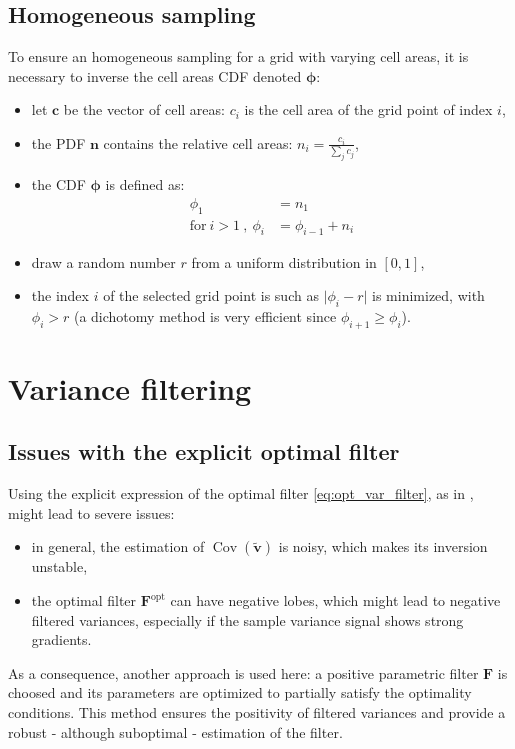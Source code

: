 \documentclass[12pt]{scrartcl}
\DeclareMathOperator{\Cov}{Cov}
\begin{document}
\subsection{Homogeneous sampling}
To ensure an homogeneous sampling for a grid with varying cell areas, it is necessary to inverse the cell areas CDF denoted $\boldsymbol{\phi}$:
\begin{itemize}
\item let $\mathbf{c}$ be the vector of cell areas: $c_i$ is the cell area of the grid point of index $i$,
\item the PDF $\mathbf{n}$ contains the relative cell areas: $\displaystyle n_i = \frac{c_i}{\sum_j c_j}$,
\item the CDF $\boldsymbol{\phi}$ is defined as:
\begin{subequations}
\begin{align}
\phi_1 & = n_1 \\
\text{for} \ i > 1 \ , \ \phi_i & = \phi_{i-1} + n_i
\end{align}
\end{subequations}
\item draw a random number $r$ from a uniform distribution in $[0,1]$,
\item the index $i$ of the selected grid point is such as $\vert \phi_i - r \vert$ is minimized, with $\phi_i > r$ (a dichotomy method is very efficient since $\phi_{i+1} \ge \phi_i$).
\end{itemize}

\clearpage

\section{Variance filtering}

\subsection{Issues with the explicit optimal filter}
Using the explicit expression of the optimal filter \eqref{eq:opt_var_filter}, as in \citet{raynaud_2009}, might lead to severe issues:
\begin{itemize}
\item in general, the estimation of $\Cov\left(\widetilde{\mathbf{v}}\right)$ is noisy, which makes its inversion unstable,
\item the optimal filter $\mathbf{F}^\mathrm{opt}$ can have negative lobes, which might lead to negative filtered variances, especially if the sample variance signal shows strong gradients.
\end{itemize}
As a consequence, another approach is used here: a positive parametric filter $\mathbf{F}$ is choosed and its parameters are optimized to partially satisfy the optimality conditions. This method ensures the positivity of filtered variances and provide a robust - although suboptimal - estimation of the filter.
\end{document}
